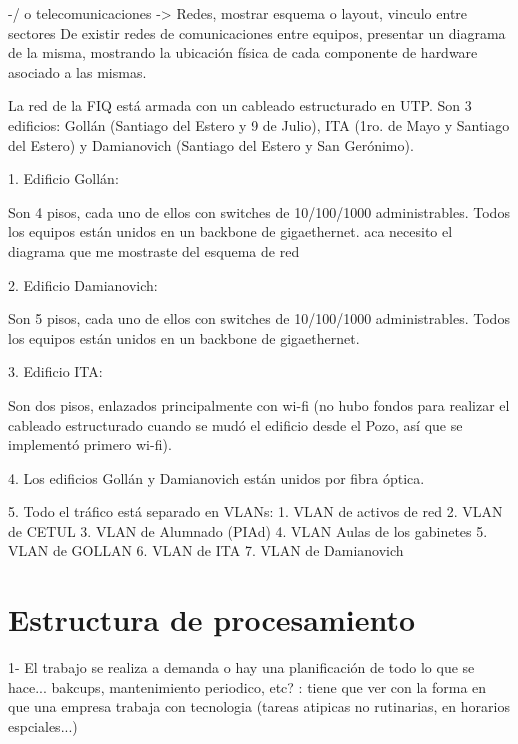 \documentclass[10pt,a4paper,final]{article}
\begin{document}
\begin{scriptsize}
-/ o telecomunicaciones -> Redes, mostrar esquema o layout, vinculo entre sectores
 De existir redes de comunicaciones entre equipos, presentar un diagrama de la misma, mostrando la ubicación física de cada componente de hardware asociado a las mismas.

La red de la FIQ está armada con un cableado estructurado en UTP. Son 3 edificios: Gollán (Santiago del Estero y 9 de Julio), ITA (1ro. de Mayo y Santiago del Estero) y Damianovich (Santiago del Estero y San Gerónimo).

1. Edificio Gollán:

  Son 4 pisos, cada uno de ellos con switches de 10/100/1000 administrables. Todos los equipos están unidos en un backbone de gigaethernet.
aca necesito el diagrama que me mostraste del esquema de red

2. Edificio Damianovich: 

  Son 5 pisos, cada uno de ellos con switches de 10/100/1000 administrables. Todos los equipos están unidos en un backbone de gigaethernet. 

3. Edificio ITA: 

  Son dos pisos, enlazados principalmente con wi-fi (no hubo fondos para realizar el cableado estructurado cuando se mudó el edificio desde el Pozo, así que se implementó primero wi-fi).

4. Los edificios Gollán y Damianovich están unidos por fibra óptica.

5. Todo el tráfico está separado en VLANs: 
  1. VLAN de activos de red
  2. VLAN de CETUL
  3. VLAN de Alumnado (PIAd)
  4. VLAN Aulas de los gabinetes
  5. VLAN de GOLLAN
  6. VLAN de ITA
  7. VLAN de Damianovich
\end{scriptsize}

\section{Estructura de procesamiento}
1- El trabajo se realiza a demanda o hay una planificación de todo lo que se hace... bakcups, mantenimiento periodico, etc?
: tiene que ver con la forma en que una empresa trabaja con tecnologia (tareas atipicas no rutinarias, en horarios espciales...)
\end{document}
